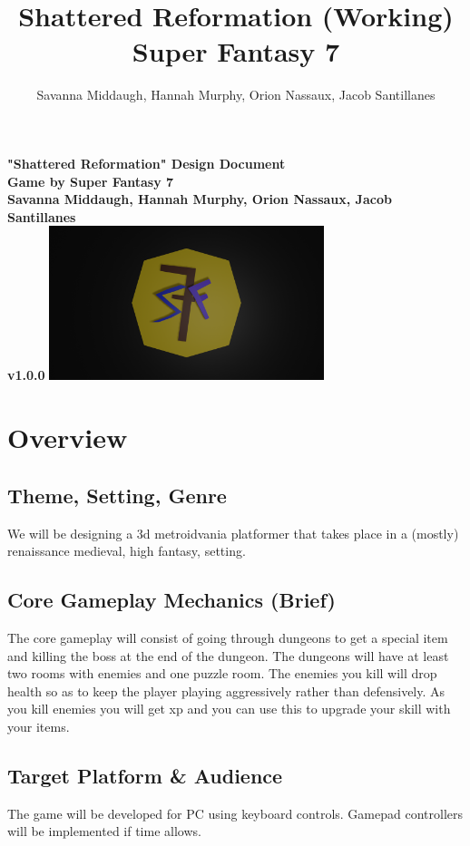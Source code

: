 \documentclass[titlepage]{article}
\title{Shattered Reformation (Working)\\Super Fantasy 7}
\author{Savanna Middaugh, Hannah Murphy, Orion Nassaux, Jacob Santillanes}
\begin{document}
\begin{titlepage}
    \centering
    \vfill
    {\bfseries\Large
        "Shattered Reformation" Design Document\\
        Game by Super Fantasy 7\\
        \vskip2cm
        Savanna Middaugh, Hannah Murphy, Orion Nassaux, Jacob Santillanes\\
	v1.0.0
    }    
    \vfill
    \includegraphics[width=8cm]{./images/logo.png}
    \vfill
    \vfill
\end{titlepage}

\section{Overview}

\subsection*{Theme, Setting, Genre}
We will be designing a 3d metroidvania platformer that takes place in a (mostly)
 renaissance medieval, high fantasy, setting. 

\subsection*{Core Gameplay Mechanics (Brief)}
The core gameplay will consist of going through dungeons to get a special item 
and killing the boss at the end of the dungeon. The dungeons will have at least 
two rooms with enemies and one puzzle room. The enemies you kill will drop 
health so as to keep the player playing aggressively rather than defensively. As
 you kill enemies you will get xp and you can use this to upgrade your skill 
 with your items. 

\subsection*{Target Platform \& Audience}
The game will be developed for PC using keyboard controls. Gamepad controllers 
will be implemented if time allows. \\
\end{document}
